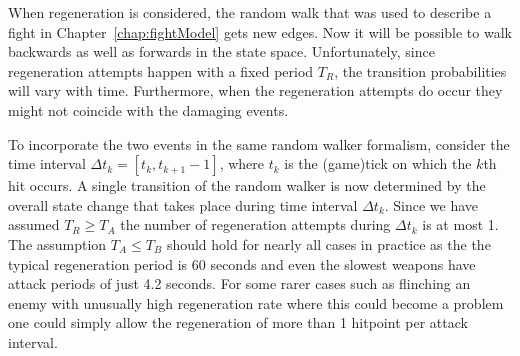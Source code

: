 When regeneration is considered, the random walk that was used to describe a fight in Chapter~\ref{chap:fightModel} gets new edges. Now it will be possible to walk backwards as well as forwards in the state space. Unfortunately, since regeneration attempts happen with a fixed period $T_R$, the transition probabilities will vary with time. Furthermore, when the regeneration attempts do occur they might not coincide with the damaging events.

To incorporate the two events in the same random walker formalism, consider the time interval $\Delta t_k = [t_k, t_{k+1}-1]$, where $t_k$ is the (game)tick on which the $k$th hit occurs. A single transition of the random walker is now determined by the overall state change that takes place during time interval $\Delta t_k$. Since we have assumed $T_R \geq T_A$ the number of regeneration attempts during $\Delta t_k$ is at most 1.
The assumption $T_A \leq T_B$ should hold for nearly all cases in practice as the the typical regeneration period is 60 seconds and even the slowest weapons have attack periods of just 4.2 seconds. For some rarer cases such as flinching an enemy with unusually high regeneration rate where this could become a problem one could simply allow the regeneration of more than 1 hitpoint per attack interval.

